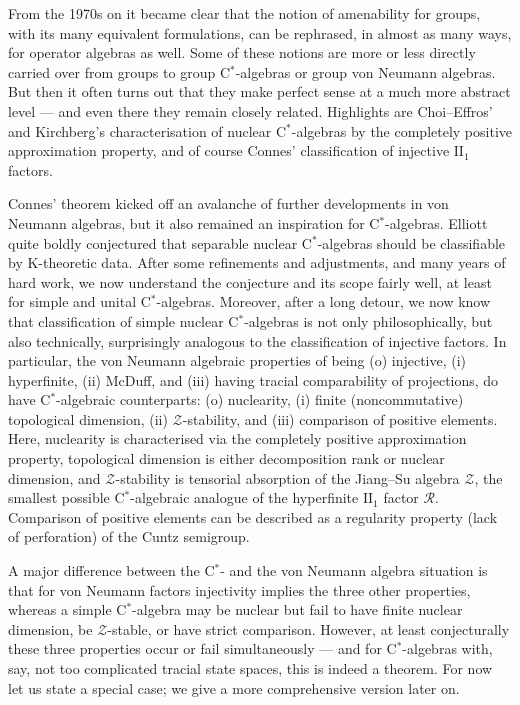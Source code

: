 \documentclass{amsart}
\begin{document}
From the 1970s on it became clear that the notion of amenability for groups, with its many equivalent formulations, can be rephrased, in almost as many ways, for operator algebras as well. Some of these notions are more or less directly carried over from groups to group C$^*$-algebras or group von Neumann algebras. But then it often turns out that they make perfect sense at a much more abstract level --- and even there they remain closely related. Highlights are Choi--Effros' and Kirchberg's characterisation of nuclear C$^*$-algebras by the completely positive approximation property, and of course Connes' classification of injective $\mathrm{II}_1$ factors.  

Connes' theorem kicked off an avalanche of further developments in von Neumann algebras, but it also remained an inspiration for C$^*$-algebras. Elliott quite boldly conjectured that separable nuclear C$^*$-algebras should be classifiable by K-theoretic data. After some refinements and adjustments, and many years of hard work, we now understand the conjecture and its scope fairly well, at least for simple and unital C$^*$-algebras. Moreover, after a long detour, we now know that classification of simple nuclear C$^*$-algebras is not only philosophically, but also technically, surprisingly analogous to the classification of injective factors. In particular, the von Neumann algebraic properties of being (o) injective, (i) hyperfinite, (ii) McDuff, and (iii) having tracial comparability of projections, do have C$^*$-algebraic counterparts: (o) nuclearity, (i) finite (noncommutative) topological  dimension, (ii) $\mathcal{Z}$-stability, and (iii) comparison of positive elements. Here, nuclearity is characterised via the completely positive approximation property, topological dimension is either decomposition rank or nuclear dimension, and $\mathcal{Z}$-stability is tensorial absorption of the Jiang--Su algebra $\mathcal{Z}$, the smallest possible C$^*$-algebraic analogue of the hyperfinite $\mathrm{II}_1$ factor $\mathcal{R}$. Comparison of positive elements can be described as a regularity property (lack of perforation) of the Cuntz semigroup. 

A major difference between the C$^*$- and the von Neumann algebra situation is that for von Neumann factors injectivity implies the three other properties, whereas a simple C$^*$-algebra may be nuclear but fail to have finite nuclear dimension, be $\mathcal{Z}$-stable, or have strict comparison. However, at least conjecturally these three properties occur or fail simultaneously --- and for C$^*$-algebras with, say, not too complicated tracial state spaces, this is indeed a theorem. For now let us state a special case; we give a more comprehensive version later on. 
\end{document}
